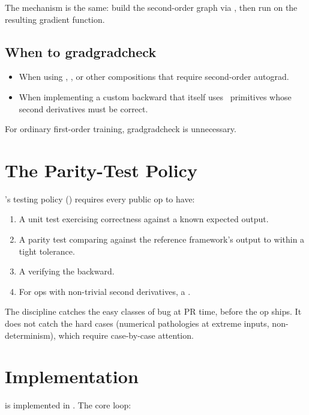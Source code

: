 The mechanism is the same: build the second-order graph via
, then run  on
the resulting gradient function.

\subsection{When to gradgradcheck}
\label{ssec:gradcheck:when_gg}

\begin{itemize}
  \item When using , , or
    other compositions that require second-order autograd.
  \item When implementing a custom backward that itself uses
    \Lucid\ primitives whose second derivatives must be correct.
\end{itemize}

For ordinary first-order training, gradgradcheck is unnecessary.

\section{The Parity-Test Policy}
\label{sec:gradcheck:parity_policy}

\Lucid's testing policy
() requires every public op to have:

\begin{enumerate}
  \item A unit test exercising correctness against a known
    expected output.
  \item A parity test comparing against the reference framework's
    output to within a tight tolerance.
  \item A  verifying the backward.
  \item For ops with non-trivial second derivatives, a
    .
\end{enumerate}

The discipline catches the easy classes of bug at PR time, before
the op ships. It does not catch the hard cases (numerical
pathologies at extreme inputs, non-determinism), which require
case-by-case attention.

\section{Implementation}
\label{sec:gradcheck:implementation}

 is implemented in .
The core loop:

